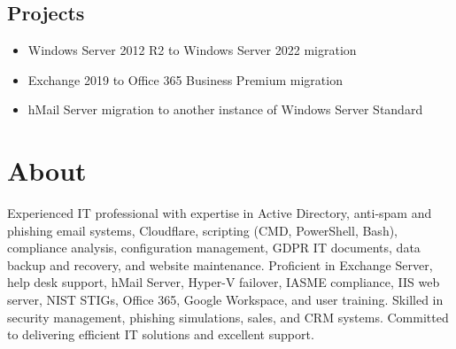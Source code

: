 \documentclass[letterpaper,10pt]{article}
\begin{document}
\begin{center}
\begin{minipage}[t]{0.5\textwidth}
		\section*{Projects}
		\begin{itemize}
			\item Windows Server 2012 R2 to Windows Server 2022 migration
			\item Exchange 2019 to Office 365 Business Premium migration
			\item hMail Server migration to another instance of Windows Server Standard
		\end{itemize}
	\end{minipage}
\end{center}
			
			\section*{About}
			Experienced IT professional with expertise in Active Directory, anti-spam and phishing email systems, Cloudflare, scripting (CMD, PowerShell, Bash), compliance analysis, configuration management, GDPR IT documents, data backup and recovery, and website maintenance. Proficient in Exchange Server, help desk support, hMail Server, Hyper-V failover, IASME compliance, IIS web server, NIST STIGs, Office 365, Google Workspace, and user training. Skilled in security management, phishing simulations, sales, and CRM systems. Committed to delivering efficient IT solutions and excellent support.
					
		
\end{document}
